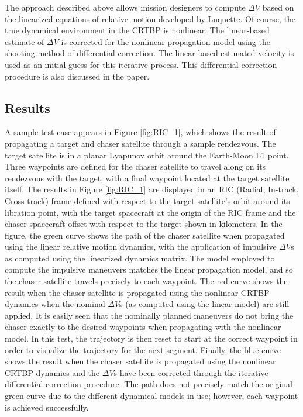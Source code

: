 \documentclass[a4paper]{article}
\begin{document}
The approach described above allows mission designers to compute \(\Delta V\) based on the linearized equations of relative motion developed by Luquette.  Of course, the true dynamical environment in the CRTBP is nonlinear. The linear-based estimate of \(\Delta V\) is corrected for the nonlinear propagation model using the shooting method of differential correction.  The linear-based estimated velocity is used as an initial guess for this iterative process.  This differential correction procedure is also discussed in the paper.


\subsection*{Results}


A sample test case appears in Figure \ref{fig:RIC_1}, which shows the result of propagating a target and chaser satellite through a sample rendezvous.  The target satellite is in a planar Lyapunov orbit around the Earth-Moon L1 point.  Three waypoints are defined for the chaser satellite to travel along on its rendezvous with the target, with a final waypoint located at the target satellite itself.  The results in Figure \ref{fig:RIC_1} are displayed in an RIC (Radial, In-track, Cross-track) frame defined with respect to the target satellite's orbit around its libration point, with the target spacecraft at the origin of the RIC frame and the chaser spacecraft offset with respect to the target shown in kilometers.  In the figure, the green curve shows the path of the chaser satellite when propagated using the linear relative motion dynamics, with the application of impulsive \(\Delta V\)s as computed using the linearized dynamics matrix.  The model employed to compute the impulsive maneuvers matches the linear propagation model, and so the chaser satellite travels precisely to each waypoint.  The red curve shows the result when the chaser satellite is propagated using the nonlinear CRTBP dynamics when the nominal \(\Delta V\)s (as computed using the linear model) are still applied.  It is easily seen that the nominally planned maneuvers do not bring the chaser exactly to the desired waypoints when propagating with the nonlinear model.  In this test, the trajectory is then reset to start at the correct waypoint in order to visualize the trajectory for the next segment.  Finally, the blue curve shows the result when the chaser satellite is propagated using the nonlinear CRTBP dynamics and the \(\Delta V\)s have been corrected through the iterative differential correction procedure.  The path does not precisely match the original green curve due to the different dynamical models in use; however, each waypoint is achieved successfully. 
\end{document}
